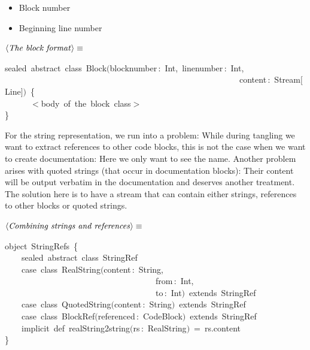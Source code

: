 \documentclass[a4paper,12pt]{article}
\begin{document}
\begin{itemize}
\item Block number
\item Beginning line number
\end{itemize}

$\left<\mbox{\emph{The block format}}\right>\equiv$
\begin{program}{\vem sealed}~{\vem abstract}~{\vem class}~Block$($blocknumber\,{\rm :}~Int,~linenumber\,{\rm :}~Int,
\\~~~~~~~~~~~~~~~~~~~~~~~~~~~~~~~~~~~~~~~~~~~~~~~~~~~~~~~~content\,{\rm :}~Stream$[$Line$]$$)$~{\small\{}
\\~~~~~~$<$body~of~the~block~{\vem class}$>$
\\{\small\}}
\\[0.5em]\end{program}



For the string representation, we run into a problem: While during tangling
we want to extract references to other code blocks, this is not the case
when we want to create documentation: Here we only want to see the name.
Another problem arises with quoted strings (that occur in documentation blocks):
Their content will be output verbatim in the documentation and deserves another
treatment. The solution here is to have a stream that can contain either
strings, references to other blocks or quoted strings.

$\left<\mbox{\emph{Combining strings and references}}\right>\equiv$
\begin{program}{\vem object}~StringRefs~{\small\{}
\\~~~~{\vem sealed}~{\vem abstract}~{\vem class}~StringRef
\\~~~~{\vem case}~{\vem class}~RealString$($content\,{\rm :}~String,
\\~~~~~~~~~~~~~~~~~~~~~~~~~~~~~~~~~~~~from\,{\rm :}~Int,
\\~~~~~~~~~~~~~~~~~~~~~~~~~~~~~~~~~~~~to\,{\rm :}~Int$)$~{\vem extends}~StringRef
\\~~~~{\vem case}~{\vem class}~QuotedString$($content\,{\rm :}~String$)$~{\vem extends}~StringRef
\\~~~~{\vem case}~{\vem class}~BlockRef$($referenced\,{\rm :}~CodeBlock$)$~{\vem extends}~StringRef
\\[0.5em]~~~~{\vem implicit}~{\vem def}~realString2string$($rs\,{\rm :}~RealString$)$~=~rs.content
\\{\small\}}
\\[0.5em]\end{program}
\end{document}
